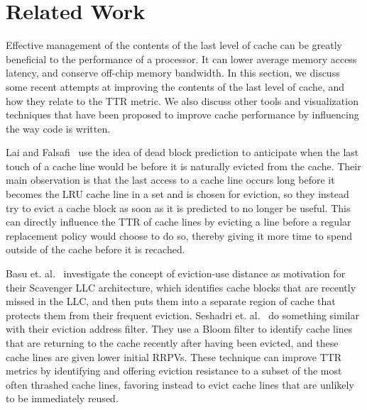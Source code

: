 \section{Related Work}

Effective management of the contents of the last level of cache can
be greatly beneficial to the performance of a processor.  It can 
lower average memory access latency, and conserve off-chip memory 
bandwidth.  In this section, we discuss some recent attempts at improving
the contents of the last level of cache, and how they relate to the TTR 
metric.  We also discuss other tools
and visualization techniques that have been proposed to improve cache
performance by influencing the way code is written.


Lai and Falsafi~\cite{Lai00} use the idea of dead block prediction to 
anticipate when the last touch of a cache line would be before it is naturally
evicted from the cache.  Their main observation is that the last access to a cache
line occurs long before it becomes the LRU cache line in a set and is chosen
for eviction, so they instead try to evict a cache block as soon as it is predicted
to no longer be useful.  This can directly influence the TTR of cache lines by evicting a line before a 
regular replacement policy would choose to do so, thereby giving it more time to spend outside of the cache 
before it is recached.

Basu et. al.~\cite{basukirman07} investigate the concept of eviction-use distance
as motivation for their Scavenger LLC architecture, which identifies
cache blocks that are recently missed in the LLC, and then puts them
into a separate region of cache that protects them from their frequent
eviction.  
Seshadri et. al.~\cite{seshadri12} do something similar with their eviction address
filter.  They use a Bloom filter to identify cache lines that are returning to the
cache recently after having been evicted, and these cache lines are given lower
initial RRPVs.
These technique can improve TTR metrics by identifying and 
offering eviction resistance to a subset of the most
often thrashed cache lines, favoring instead to evict cache lines that are
unlikely to be immediately reused.

